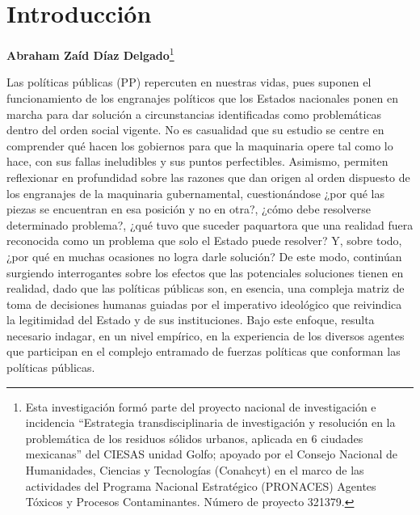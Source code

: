 \documentclass[
  spanish,
  11.5pt,
  170mm x 240mmpaper,
]{scrbook}
\renewcommand*\contentsname{Tabla de contenidos}
\newcommand\contentsname{Tabla de contenidos}
\begin{document}
\pagestyle{plain}
\setcounter{page}{1}  %

\renewcommand*\contentsname{Índice}
{
\setcounter{tocdepth}{1}
\tableofcontents
}

\mainmatter
{}

\chapter*{Introducción}\label{introducciuxf3n}


\textbf{Abraham Zaíd Díaz Delgado}\footnote{Esta investigación formó
  parte del proyecto nacional de investigación e incidencia ``Estrategia
  transdisciplinaria de investigación y resolución en la problemática de
  los residuos sólidos urbanos, aplicada en 6 ciudades mexicanas'' del
  CIESAS unidad Golfo; apoyado por el Consejo Nacional de Humanidades,
  Ciencias y Tecnologías (Conahcyt) en el marco de las actividades del
  Programa Nacional Estratégico (PRONACES) Agentes Tóxicos y Procesos
  Contaminantes. Número de proyecto 321379.}


Las políticas públicas (PP) repercuten en nuestras vidas, pues suponen
el funcionamiento de los engranajes políticos que los Estados nacionales
ponen en marcha para dar solución a circunstancias identificadas como
problemáticas dentro del orden social vigente. No es casualidad que su
estudio se centre en comprender qué hacen los gobiernos para que la
maquinaria opere tal como lo hace, con sus fallas ineludibles y sus
puntos perfectibles. Asimismo, permiten reflexionar en profundidad sobre
las razones que dan origen al orden dispuesto de los engranajes de la
maquinaria gubernamental, cuestionándose ¿por qué las piezas se
encuentran en esa posición y no en otra?, ¿cómo debe resolverse
determinado problema?, ¿qué tuvo que suceder paquartora que una realidad
fuera reconocida como un problema que solo el Estado puede resolver? Y,
sobre todo, ¿por qué en muchas ocasiones no logra darle solución? De
este modo, continúan surgiendo interrogantes sobre los efectos que las
potenciales soluciones tienen en realidad, dado que las políticas
públicas son, en esencia, una compleja matriz de toma de decisiones
humanas guiadas por el imperativo ideológico que reivindica la
legitimidad del Estado y de sus instituciones. Bajo este enfoque,
resulta necesario indagar, en un nivel empírico, en la experiencia de
los diversos agentes que participan en el complejo entramado de fuerzas
políticas que conforman las políticas públicas.
\end{document}

